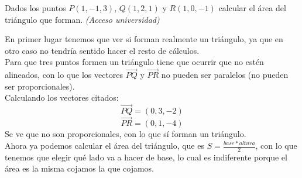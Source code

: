 \documentclass[a4paper,11pt,answers]{exam}
\begin{document}
\begin{questions}
\begin{solution}
\end{solution}
\question Dados los puntos $P(1,-1,3)$, $Q(1,2,1)$ y $R(1,0,-1)$ calcular el área del triángulo que forman. \textit{(Acceso universidad)}
\begin{solution}
En primer lugar tenemos que ver si forman realmente un triángulo, ya que en otro caso no tendría sentido hacer el resto de cálculos.\\
Para que tres puntos formen un triángulo tiene que ocurrir que no estén alineados, con lo que los vectores $\overrightarrow{PQ}$ y $\overrightarrow{PR}$ no pueden ser paralelos (no pueden ser proporcionales).\\
Calculando los vectores citados:
\[\overrightarrow{PQ} = (0,3,-2)\]
\[\overrightarrow{PR} = (0,1,-4)\]
Se ve que no son proporcionales, con lo que sí forman un triángulo.\\

Ahora ya podemos calcular el área del triángulo, que es $S=\frac{base*altura}{2}$, con lo que tenemos que elegir qué lado va a hacer de base, lo cual es indiferente porque el área es la misma cojamos la que cojamos.


\end{solution}
\end{questions}
\end{document}

